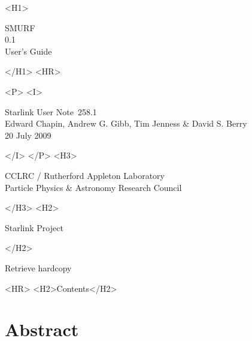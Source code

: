\documentclass[twoside,11pt]{article}
\newcommand{\stardoccategory}  {Starlink User Note}
\newcommand{\stardocsource}    {sun\stardocnumber}
\newcommand{\stardocnumber}    {258.1}
\newcommand{\stardocauthors}   {Edward Chapin, Andrew G. Gibb, Tim Jenness \& David S. Berry}
\newcommand{\stardocdate}      {20 July 2009}
\newcommand{\stardoctitle}     {SMURF}
\newcommand{\stardocversion}   {0.1}
\newcommand{\stardocmanual}    {User's Guide}
\newcommand{\htmladdnormallink}[2]{#1}
\newcommand{\htmladdimg}[1]{}
\newcommand{\htmlref}[2]{#1}
\newcommand{\htmladdtonavigation}[1]{}
\newcommand{\xlabel}[1]{}
\renewcommand{\_}{\texttt{\symbol{95}}}
\begin{document}
\begin{htmlonly}
   \xlabel{}
   \begin{rawhtml} <H1> \end{rawhtml}
      \stardoctitle\\
      \stardocversion\\
      \stardocmanual
   \begin{rawhtml} </H1> <HR> \end{rawhtml}


   \begin{rawhtml} <P> <I> \end{rawhtml}
   \stardoccategory\ \stardocnumber \\
   \stardocauthors \\
   \stardocdate
   \begin{rawhtml} </I> </P> <H3> \end{rawhtml}
      \htmladdnormallink{CCLRC / Rutherford Appleton Laboratory}
                        {http://www.cclrc.ac.uk} \\
      \htmladdnormallink{Particle Physics \& Astronomy Research Council}
                        {http://www.pparc.ac.uk} \\
   \begin{rawhtml} </H3> <H2> \end{rawhtml}
      \htmladdnormallink{Starlink Project}{http://www.starlink.rl.ac.uk/}
   \begin{rawhtml} </H2> \end{rawhtml}
   \htmladdnormallink{\htmladdimg{source.gif} Retrieve hardcopy}
      {http://www.starlink.rl.ac.uk/cgi-bin/hcserver?\stardocsource}\\

  \label{stardoccontents}
  \begin{rawhtml} 
    <HR>
    <H2>Contents</H2>
  \end{rawhtml}
  \htmladdtonavigation{\htmlref{\htmladdimg{contents_motif.gif}}
        {stardoccontents}}

  \section{\xlabel{abstract}Abstract}
\end{htmlonly}
\end{document}
